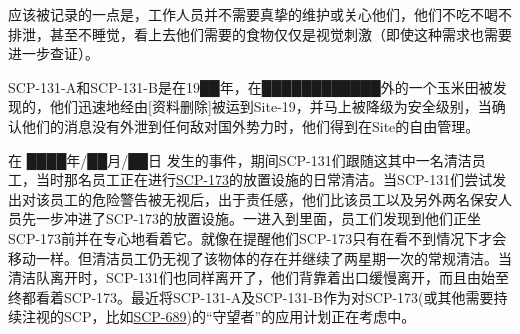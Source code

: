 应该被记录的一点是，工作人员并不需要真挚的维护或关心他们，他们不吃不喝不排泄，甚至不睡觉，看上去他们需要的食物仅仅是视觉刺激（即使这种需求也需要进一步查证）。

SCP-131-A和SCP-131-B是在19██年，在████████████外的一个玉米田被发现的，他们迅速地经由{[}资料删除]被运到Site-19，并马上被降级为安全级别，当确认他们的消息没有外泄到任何敌对国外势力时，他们得到在Site的自由管理。

在 ████年\slash ██月\slash ██日 发生的事件，期间SCP-131们跟随这其中一名清洁员工，当时那名员工正在进行\hyperref[chap:SCP-173]{SCP-173}的放置设施的日常清洁。当SCP-131们尝试发出对该员工的危险警告被无视后，出于责任感，他们比该员工以及另外两名保安人员先一步冲进了SCP-173的放置设施。一进入到里面，员工们发现到他们正坐SCP-173前并在专心地看着它。就像在提醒他们SCP-173只有在看不到情况下才会移动一样。但清洁员工仍无视了该物体的存在并继续了两星期一次的常规清洁。当清洁队离开时，SCP-131们也同样离开了，他们背靠着出口缓慢离开，而且由始至终都看着SCP-173。最近将SCP-131-A及SCP-131-B作为对SCP-173(或其他需要持续注视的SCP，比如\hyperref[chap:SCP-689]{SCP-689})的“守望者”的应用计划正在考虑中。
